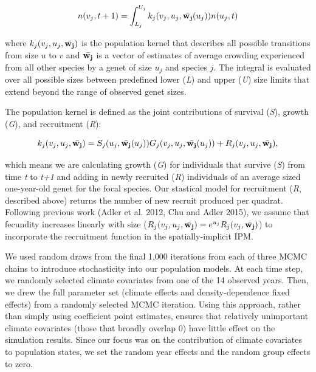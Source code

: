 \documentclass[12pt,]{article}
\begin{document}
\begin{equation}
n(v_{j},t+1) = \int_{L_{j}}^{U_{j}} k_{j}(v_{j},u_{j},\bar{\bold{w_{j}}}(u_{j}))n(u_{j},t)
\end{equation}

where $k_{j}(v_{j},u_{j},\bar{\bold{w_{j}}})$ is the population kernel
that describes all possible transitions from size $u$ to $v$ and
$\bar{\bold{w_{j}}}$ is a vector of estimates of average crowding
experienced from all other species by a genet of size $u_j$ and species
$j$. The integral is evaluated over all possible sizes between
predefined lower (\emph{L}) and upper (\emph{U}) size limits that extend
beyond the range of observed genet sizes.

The population kernel is defined as the joint contributions of survival
(\emph{S}), growth (\emph{G}), and recruitment (\emph{R}):

\begin{equation}
k_{j}(v_{j},u_{j},\bar{\bold{w_{j}}}) = S_j(u_j, \bar{\bold{w_{j}}}(u_{j}))G_j(v_{j},u_{j},\bar{\bold{w_{j}}}(u_{j})) + R_j(v_{j},u_{j},\bar{\bold{w_{j}}}),
\end{equation}

which means we are calculating growth (\emph{G}) for individuals that
survive (\emph{S}) from time \emph{t} to \emph{t+1} and adding in newly
recruited (\emph{R}) individuals of an average sized one-year-old genet
for the focal species. Our stastical model for recruitment (\emph{R},
described above) returns the number of new recruit produced per quadrat.
Following previous work (Adler et al. 2012, Chu and Adler 2015), we
assume that fecundity increases linearly with size
($R_j(v_{j},u_{j},\bar{\bold{w_{j}}}) = e^{u_j}R_j(v_{j},\bar{\bold{w_{j}}})$)
to incorporate the recruitment function in the spatially-implicit IPM.

We used random draws from the final 1,000 iterations from each of three
MCMC chains to introduce stochasticity into our population models. At
each time step, we randomly selected climate covariates from one of the
14 observed years. Then, we drew the full parameter set (climate effects
and density-dependence fixed effects) from a randomly selected MCMC
iteration. Using this approach, rather than simply using coefficient
point estimates, ensures that relatively unimportant climate covariates
(those that broadly overlap 0) have little effect on the simulation
results. Since our focus was on the contribution of climate covariates
to population states, we set the random year effects and the random
group effects to zero.
\end{document}
